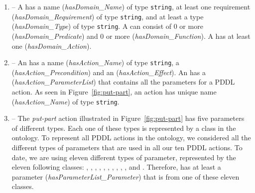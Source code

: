 %
%
\begin{enumerate}
\item {} -- A  has a name (\emph{hasDomain\_Name}) of type \texttt{string}, at least one requirement (\emph{hasDomain\_Requirement}) of type \texttt{string}, and at least a type (\emph{hasDomain\_Type}) of type \texttt{string}. A  can consist of 0 or more  (\emph{hasDomain\_Predicate}) and 0 or more  (\emph{hasDomain\_Function}). A  has at least one  (\emph{hasDomain\_Action}).
\item {} -- An  has a name (\emph{hasAction\_Name}) of type \texttt{string}, a  (\emph{hasAction\_Precondition}) and an  (\emph{hasAction\_Effect}). An  has a  (\emph{hasAction\_ParameterList}) that contains all the parameters for a PDDL action. As seen in Figure~\ref{fig:put-part}, an action has unique name (\emph{hasAction\_Name}) of type \texttt{string}.
\item {} -- The \textsl{put-part} action illustrated in Figure~\ref{fig:put-part} has five parameters of different types. Each one of these types is represented by a class in the  ontology. To represent all PDDL actions in the  ontology, we considered all the different types of parameters that are used in all our ten PDDL actions. To date, we are using eleven different types of parameter, represented by the eleven following classes: , , , , , , , , , , and . Therefore,  has at least a parameter (\emph{hasParameterList\_Parameter}) that is from one of these eleven classes.


\end{enumerate}
